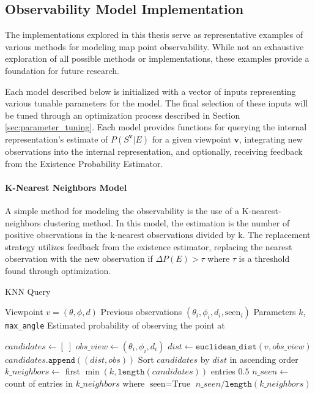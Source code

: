 \subsection{Observability Model Implementation}

The implementations explored in this thesis serve as representative examples of various methods for modeling map point observability. While not an exhaustive exploration of all possible methods or implementations, these examples provide a foundation for future research.

Each model described below is initialized with a vector of inputs representing various tunable parameters for the model. The final selection of these inputs will be tuned through an optimization process described in Section \ref{sec:parameter_tuning}. Each model provides functions for querying the internal representation's estimate of $P(S^{\boldsymbol{v}}|E)$ for a given viewpoint $\boldsymbol{v}$, integrating new observations into the internal representation, and optionally, receiving feedback from the Existence Probability Estimator.

\paragraph{K-Nearest Neighbors Model}

A simple method for modeling the observability is the use of a K-nearest-neighbors clustering method. In this model, the estimation is the number of positive observations in the k-nearest observations divided by k. The replacement strategy utilizes feedback from the existence estimator, replacing the nearest observation with the new observation if $\Delta P(E) > \tau$ where $\tau$ is a threshold found through optimization.

\singlespacing
\begin{algorithm}[H]
    \caption{KNN Query}
    \label{alg:query}
    \begin{algorithmic}
        \Require Viewpoint $v = (\theta, \phi, d)$
        \Require Previous observations $(\theta_i, \phi_i, d_i, \text{seen}_i)$
        \Require Parameters $k$, \texttt{max\_angle}
        \Ensure Estimated probability of observing the point at 

        \State $candidates \gets [\;]$
        \State $obs\_view \gets (\theta_i, \phi_i, d_i)$
        \State $dist \gets \texttt{euclidean\_dist}(v, obs\_view)$
        \State $candidates.\texttt{append}((dist, obs))$
        \EndIf
        \EndFor
        \State Sort $candidates$ by $dist$ in ascending order
        \State $k\_neighbors \gets$ first $\min(k, \texttt{length}(candidates))$ entries
        \State \Return $0.5$
        \EndIf
        \State $n\_seen \gets$ count of entries in $k\_neighbors$ where $\text{seen} = \text{True}$
        \State \Return $n\_seen / \texttt{length}(k\_neighbors)$
    \end{algorithmic}
\end{algorithm}
\doublespacing

